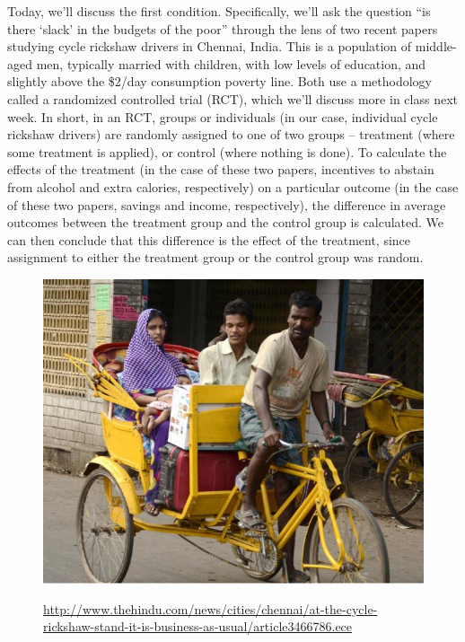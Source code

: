 \documentclass[12pt,english]{article}
\begin{document}
Today, we'll discuss the first condition. Specifically, we'll ask the question ``is there `slack' in the budgets of the poor'' through the lens of two recent papers studying cycle rickshaw drivers in Chennai, India. This is a population of middle-aged men, typically married with children, with low levels of education, and slightly above the \$2/day consumption poverty line. Both use a methodology called a randomized controlled trial (RCT), which we'll discuss more in class next week. In short, in an RCT, groups or individuals (in our case, individual cycle rickshaw drivers) are randomly assigned to one of two groups -- treatment (where some treatment is applied), or control (where nothing is done). To calculate the effects of the treatment (in the case of these two papers, incentives to abstain from alcohol and extra calories, respectively) on a particular outcome (in the case of these two papers, savings and income, respectively), the difference in average outcomes between the treatment group and the control group is calculated. We can then conclude that this difference is the effect of the treatment, since assignment to either the treatment group or the control group was random.

\begin{figure}[H]
\begin{center}
\begin{adjustbox}{
		max width=0.65\textwidth,
	}
\includegraphics{cyclerickshaw.jpg}
\end{adjustbox}
\end{center}
\begin{adjustwidth}{0.175\textwidth}{0.175\textwidth}
\href{http://www.thehindu.com/news/cities/chennai/at-the-cycle-rickshaw-stand-it-is-business-as-usual/article3466786.ece}{http://www.thehindu.com/news/cities/chennai/at-the-cycle-rickshaw-stand-it-is-business-as-usual/article3466786.ece}
\end{adjustwidth}
\end{figure}
\end{document}
